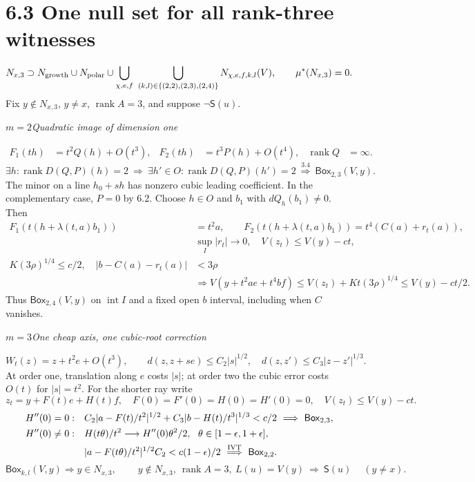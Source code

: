 \documentclass[11pt]{article}
\newcommand{\rk}{\operatorname{rank}}
\newcommand{\suppc}{\mathsf{S}}
\newcommand{\boxd}{\mathsf{Box}}
\newcommand{\rowhead}[2]{\par\medskip\noindent\textbf{#1}\quad\textit{#2}\par}
\newcommand{\newpart}[1]{\clearpage\section*{#1}}
\begin{document}
\newpart{6.3 \quad One null set for all rank-three witnesses}
\[
 N_{x,3}\supset N_{\rm growth}\cup N_{\rm polar}\cup
 \bigcup_{\chi,e,f}\ \bigcup_{(k,l)\in\{(2,2),(2,3),(2,4)\}}
     N_{\chi,e,f,k,l}(V),\qquad \mu^*(N_{x,3})=0 .
\]
Fix $y\notin N_{x,3}$, $y\ne x$, $\rk A=3$, and suppose $\neg\suppc(u)$.
\rowhead{$m=2$}{Quadratic image of dimension one}
\begin{align*}
 F_1(th)&=t^2Q(h)+O(t^3),&
 F_2(th)&=t^3P(h)+O(t^4),& \rk Q&=\infty .
\end{align*}
\[
 \exists h:\rk D(Q,P)(h)=2
 \ \Longrightarrow\ \exists h'\in O:\rk D(Q,P)(h')=2
 \ \overset{3.4}{\Longrightarrow}\ \boxd_{2,3}(V,y).
\]
The minor on a line $h_0+sh$ has nonzero cubic leading coefficient.
In the complementary case, $P=0$ by 6.2. Choose $h\in O$ and $b_1$ with
$dQ_h(b_1)\ne0$. Then
\begin{align*}
 F_1(t(h+\lambda(t,a)b_1))&=t^2a,\qquad
 F_2(t(h+\lambda(t,a)b_1))=t^4(C(a)+r_t(a)),\\
 &\sup_I|r_t|\to0,\quad V(z_t)\le V(y)-ct,\\
 K(3\rho)^{1/4}\le c/2,\quad
 |b-C(a)-r_t(a)|&<3\rho\\
 &\Longrightarrow V(y+t^2ae+t^4bf)
 \le V(z_t)+Kt(3\rho)^{1/4}\le V(y)-ct/2 .
\end{align*}
Thus $\boxd_{2,4}(V,y)$ on $\operatorname{int}I$ and a fixed open $b$ interval,
including when $C$ vanishes.
\rowhead{$m=3$}{One cheap axis, one cubic-root correction}
\[
 W_t(z)=z+t^2e+O(t^3),\qquad
 d(z,z+se)\le C_2|s|^{1/2},\quad d(z,z')\le C_3|z-z'|^{1/3}.
\]
At order one, translation along $e$ costs $|s|$; at order two the cubic
error costs $O(t)$ for $|s|=t^2$. For the shorter ray write
\[
 z_t=y+F(t)e+H(t)f,\quad F(0)=F'(0)=H(0)=H'(0)=0,\quad
 V(z_t)\le V(y)-ct .
\]
\begin{align*}
 H''(0)=0:\quad
 &C_2|a-F(t)/t^2|^{1/2}+C_3|b-H(t)/t^3|^{1/3}<c/2
   \ \Longrightarrow\ \boxd_{2,3},\\
 H''(0)\ne0:\quad
 &H(t\theta)/t^2\longrightarrow H''(0)\theta^2/2,\ \
   \theta\in[1-\epsilon,1+\epsilon],\\
 &|a-F(t\theta)/t^2|^{1/2}C_2<c(1-\epsilon)/2
 \ \overset{\rm IVT}{\Longrightarrow}\ \boxd_{2,2}.
\end{align*}
\[
 \boxd_{k,l}(V,y)\Longrightarrow y\in N_{x,3},\qquad
 \boxed{\ y\notin N_{x,3},\ \rk A=3,\ L(u)=V(y)\ \Longrightarrow\ \suppc(u)\ } \quad(y\ne x).
\]
\end{document}
